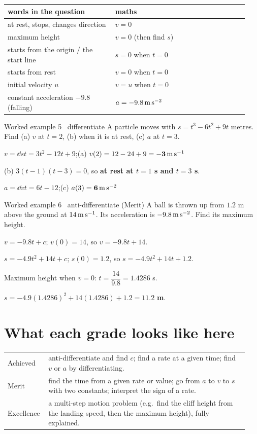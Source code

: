 \documentclass[11pt]{article}
\begin{document}
\begin{tabular}{@{}p{0.42\linewidth}p{0.52\linewidth}@{}}
\toprule
words in the question & maths\\
\midrule
at rest, stops, changes direction & $v=0$\\
maximum height & $v=0$ (then find $s$)\\
starts from the origin / the start line & $s=0$ when $t=0$\\
starts from rest & $v=0$ when $t=0$\\
initial velocity $u$ & $v=u$ when $t=0$\\
constant acceleration $-9.8$ (falling) & $a=-9.8\,\mathrm{m\,s^{-2}}$\\
\bottomrule
\end{tabular}

\begin{example}{Worked example 5 \textperiodcentered\ differentiate}
A particle moves with $s=t^{3}-6t^{2}+9t$ metres. Find (a) $v$ at $t=2$, (b) when it is at rest, (c) $a$ at $t=3$.
\begin{steps}
\item $v=\dd{s}{t}=3t^{2}-12t+9$;\quad (a) $v(2)=12-24+9=\mathbf{-3\,\mathrm{m\,s^{-1}}}$
\item (b) $3(t-1)(t-3)=0$, so \textbf{at rest at $t=1$ s and $t=3$ s}.
\item $a=\dd{v}{t}=6t-12$;\quad (c) $a(3)=\mathbf{6\,\mathrm{m\,s^{-2}}}$
\end{steps}
\end{example}

\begin{example}{Worked example 6 \textperiodcentered\ anti-differentiate (Merit)}
A ball is thrown up from $1.2$ m above the ground at $14\,\mathrm{m\,s^{-1}}$. Its acceleration is $-9.8\,\mathrm{m\,s^{-2}}$. Find its maximum height.
\begin{steps}
\item $v=-9.8t+c$; $v(0)=14$, so $v=-9.8t+14$.
\item $s=-4.9t^{2}+14t+c$; $s(0)=1.2$, so $s=-4.9t^{2}+14t+1.2$.
\item Maximum height when $v=0$: $t=\dfrac{14}{9.8}=1.4286$ s.
\item $s=-4.9(1.4286)^{2}+14(1.4286)+1.2=\mathbf{11.2}$ \textbf{m}.
\end{steps}
\end{example}

\section{What each grade looks like here}\label{grades}
\begin{tabular}{@{}p{0.14\linewidth}p{0.80\linewidth}@{}}
\toprule
Achieved & anti-differentiate and find $c$; find a rate at a given time; find $v$ or $a$ by differentiating.\\
Merit & find the time from a given rate or value; go from $a$ to $v$ to $s$ with two constants; interpret the sign of a rate.\\
Excellence & a multi-step motion problem (e.g.\ find the cliff height from the landing speed, then the maximum height), fully explained.\\
\bottomrule
\end{tabular}
\end{document}
